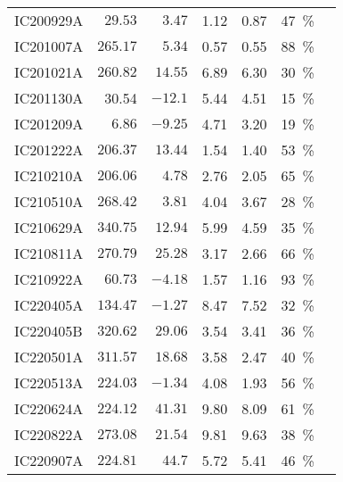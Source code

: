 \begin{table*}
\begin{tabular}{l r r r r c c}
        IC200929A & $29.53$ & $3.47$ & 1.12 & 0.87 & \SI{47}{\percent}&\cite{IC200929A1, IC200929A2}\\
        IC201007A & $265.17$ & $5.34$ & 0.57 & 0.55 & \SI{88}{\percent}&\cite{IC201007A1, IC201007A2}\\
        IC201021A & $260.82$ & $14.55$ & 6.89 & 6.30 & \SI{30}{\percent}&\cite{IC201021A1, IC201021A2}\\
        IC201130A & 30.54 & $-12.1$ & 5.44 & 4.51 & \SI{15}{\percent}&\cite{IC201130A1, IC201130A2}\\
        IC201209A & $6.86$ & $-9.25$ & 4.71 & 3.20 & \SI{19}{\percent}&\cite{IC201209A1, IC201209A2}\\
        IC201222A & $206.37$ & $13.44$ & 1.54 & 1.40 & \SI{53}{\percent}&\cite{IC201222A1, IC201222A2}\\
        IC210210A & $206.06$ & $4.78$ & 2.76 & 2.05 & \SI{65}{\percent}&\cite{IC210210A1, IC210210A2}\\
        IC210510A & $268.42$ & $3.81$ & 4.04 & 3.67 & \SI{28}{\percent}&\cite{IC210510A1, IC210510A2}\\
        IC210629A & $340.75$ & $12.94$ & 5.99 & 4.59 & \SI{35}{\percent}&\cite{IC210629A1, IC210629A2, IC210629A3}\\
        IC210811A & $270.79$ & $25.28$ & 3.17 & 2.66 & \SI{66}{\percent}&\cite{IC210811A1, IC210811A2}\\
        IC210922A & $60.73$ & $-4.18$ & 1.57 & 1.16 & \SI{93}{\percent}&\cite{IC210922A1, IC210922A2}\\
        IC220405A & $134.47$ & $-1.27$ & 8.47 & 7.52 & \SI{32}{\percent}&\cite{IC220405A1, IC220405A2}\\
        IC220405B & $320.62$ & $29.06$ & 3.54 & 3.41 & \SI{36}{\percent}&\cite{IC220405B1, IC220405A2}\\
        IC220501A & $311.57$ & $18.68$ & 3.58 & 2.47 & \SI{40}{\percent}&\cite{IC220501A1, IC220501A2}\\
        IC220513A & $224.03$ & $-1.34$ & 4.08 & 1.93 & \SI{56}{\percent}&\cite{IC220513A1, IC220513A2}\\
        IC220624A & $224.12$ & $41.31$ & 9.80 & 8.09 & \SI{61}{\percent}&\cite{IC220624A1, IC220624A2}\\
        IC220822A & $273.08$ & $21.54$ & 9.81 & 9.63 & \SI{38}{\percent}&\cite{IC220822A1, IC220822A2}\\
        IC220907A & $224.81$ & $44.7$ & 5.72 & 5.41 & \SI{46}{\percent}&\cite{IC220907A1, IC220907A2, IC220907A3}\\

\end{tabular}
\end{table*}
